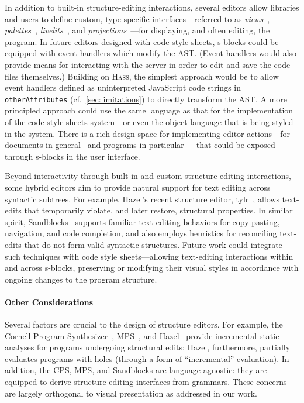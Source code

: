 \documentclass[acmsmall, screen]{acmart}
\newcommand{\parahead}[1]
  {\paragraph{\textbf{#1}}}
\newcommand{\hass}
{\textsc{Hass}}
\begin{document}
In addition to built-in structure-editing interactions, several editors allow libraries and users to define custom, type-specific interfaces---referred to as \emph{views}~\cite{Ko2006}, \emph{palettes}~\cite{ActiveCodeCompletion}, \emph{livelits}~\cite{Omar2021}, and \emph{projections}~\cite{MPS}---for displaying, and often editing, the program.
In future editors designed with code style sheets, s-blocks could be equipped with event handlers which modify the AST.
(Event handlers would also provide means for interacting with the server in order to edit and save the code files themselves.)
Building on \hass{}, the simplest approach would be to allow event handlers defined as uninterpreted JavaScript code strings in \texttt{otherAttributes} (cf.~\autoref{sec:limitations}) to directly transform the AST.
A more principled approach could use the same language as that for the implementation of the code style sheets system---or even the object language that is being styled in the system.
There is a rich design space for implementing editor actions---for documents in general~\citep{Crichton2024} and programs in particular~\citep{Omar2017,Omar2021}---that could be exposed through s-blocks in the user interface.



Beyond interactivity through built-in and custom structure-editing interactions, some hybrid editors aim to provide natural support for text editing across syntactic subtrees.
For example, Hazel's recent structure editor, tylr~\cite{TeenTylr}, allows text-edits that temporarily violate, and later restore, structural properties.
In similar spirit, Sandblocks~\cite{Beckmann2023} supports familiar text-editing behaviors for copy-pasting, navigation, and code completion, and also employs heuristics for reconciling text-edits that do not form valid syntactic structures.
Future work could integrate such techniques with code style sheets---allowing text-editing interactions within and across s-blocks, preserving or modifying their visual styles in accordance with ongoing changes to the program structure.



\parahead{Other Considerations}

Several factors are crucial to the design of structure editors.
For example, the Cornell Program Synthesizer~\cite{cornellProgramSynthesizer}, MPS~\cite{Voelter2012, Voelter2016GrammarCells, Voelter2016IncA, Voelter2018, Voelter2019}, and Hazel~\cite{Omar2017, HazelnutLive} provide incremental static analyses for programs undergoing structural edits; Hazel, furthermore, partially evaluates programs with holes (through a form of ``incremental'' evaluation).
In addition, the CPS, MPS, and Sandblocks are language-agnostic: they are equipped to derive structure-editing interfaces from grammars.
These concerns are largely orthogonal to visual presentation as addressed in our work.
\end{document}
